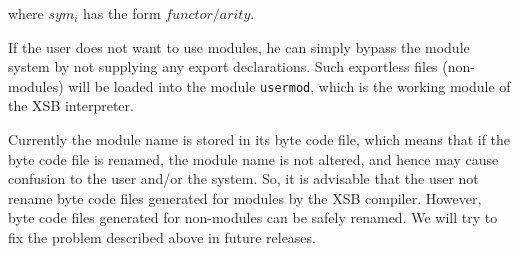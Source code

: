 \noindent
where $sym_i$ has the form $functor/arity$.

If the user does not want to use modules, he can simply
bypass the module system by not supplying any export declarations.
Such exportless files (non-modules) will be loaded into the module 
{\tt usermod}, which is the working module of the XSB interpreter.

Currently the module name is stored in its byte code file, which means
that if the byte code file is renamed, the module name is not altered,
and hence may cause confusion to the user and/or the system.  So, it
is advisable that the user not rename byte code files generated for
modules by the XSB compiler.  However, byte code files generated for
non-modules can be safely renamed.  We will try to fix the problem
described above in future releases.

